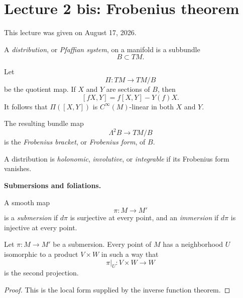 \medskip\noindent
\section{Lecture 2 bis: Frobenius theorem}
\label{section-lecture-two-bis-frobenius}

\noindent
This lecture was given on August 17, 2026.

\begin{definition}
\label{definition-distribution}
A {\it distribution}, or
{\it Pfaffian system}, on a manifold is a
subbundle
$$
B\subset TM.
$$
\end{definition}

Let
$$
\Pi:TM\longrightarrow TM/B
$$
be the quotient map. If $X$ and $Y$ are
sections of $B$, then
$$
[fX,Y]=f[X,Y]-Y(f)X.
$$
It follows that $\Pi([X,Y])$ is
$C^\infty(M)$-linear in both $X$ and $Y$.

\begin{definition}
\label{definition-frobenius-form}
The resulting bundle map
$$
\Lambda^2B\longrightarrow TM/B
$$
is the {\it Frobenius bracket}, or
{\it Frobenius form}, of $B$.
\end{definition}

\begin{definition}
\label{definition-involutive-distribution}
A distribution is {\it holonomic},
{\it involutive}, or {\it integrable} if
its Frobenius form vanishes.
\end{definition}

\medskip\noindent
{\bf Submersions and foliations.}

\begin{definition}
\label{definition-submersion-immersion}
A smooth map
$$
\pi:M\longrightarrow M'
$$
is a {\it submersion} if $d\pi$ is
surjective at every point, and an
{\it immersion} if $d\pi$ is injective at
every point.
\end{definition}

\begin{proposition}
\label{proposition-submersion-local-form}
Let $\pi:M\longrightarrow M'$ be a
submersion. Every point of $M$ has a
neighborhood $U$ isomorphic to a product
$V\times W$ in such a way that
$$
\pi|_U:V\times W\longrightarrow W
$$
is the second projection.
\end{proposition}

\begin{proof}
This is the local form supplied by the
inverse function theorem.
\end{proof}


